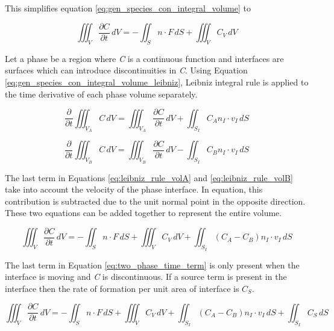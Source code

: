 This simplifies equation \ref{eq:gen_species_con_integral_volume} to 

\begin{equation}
	 \iiint_V \frac{\partial C}{\partial t}\,dV = -\iint_S n \cdot F \,dS + \iiint_V C_{V} \,dV
	\label{eq:gen_species_con_integral_volume_leibniz}
\end{equation}

Let a phase be a region where \textit{C} is a continuous function and interfaces are surfaces which can introduce discontinuities in \textit{C}. Using Equation \ref{eq:gen_species_con_integral_volume_leibniz}, Leibniz integral rule is applied to the time derivative of each phase volume separately. 

\begin{equation}
	\frac{\partial }{\partial t}\iiint_{V_{A}} C \,dV = \iiint_{V_{A}} \frac{\partial C}{\partial t}\,dV + \iint_{S_{I}} C_{A} n_{I} \cdot v_{I} \,dS
	\label{eq:leibniz_rule_volA}
\end{equation}

\begin{equation}
	\frac{\partial }{\partial t}\iiint_{V_{B}} C \,dV = \iiint_{V_{B}} \frac{\partial C}{\partial t}\,dV - \iint_{S_{I}} C_{B} n_{I} \cdot v_{I} \,dS
	\label{eq:leibniz_rule_volB}
\end{equation}

The last term in Equations \ref{eq:leibniz_rule_volA} and \ref{eq:leibniz_rule_volB} take into account the velocity of the phase interface. In equation, this contribution is subtracted due to the unit normal point in the opposite direction. These two equations can be added together to represent the entire volume. 

\begin{equation}
	 \iiint_V \frac{\partial C}{\partial t}\,dV = -\iint_S n \cdot F \,dS + \iiint_V C_{V} \,dV + \iint_{S_{I}} (C_{A} - C_{B}) n_{I} \cdot v_{I} \,dS
	\label{eq:two_phase_time_term}
\end{equation}

The last term in Equation \ref{eq:two_phase_time_term} is only present when  the interface is moving and \textit{C} is discontinuous. If a source term is present in the interface then the rate of formation per unit area of interface is ${C_{S}}$. 

\begin{equation}
	 \iiint_V \frac{\partial C}{\partial t}\,dV = -\iint_S n \cdot F \,dS + \iiint_V C_{V} \,dV + \iint_{S_{I}} (C_{A} - C_{B}) n_{I} \cdot v_{I} \,dS + \iint_{S_{I}} C_{S}   \,dS
	\label{eq:two_phase_Intarea_source}
\end{equation}

